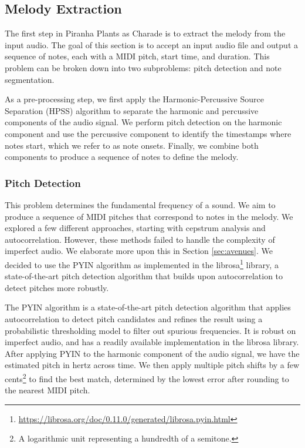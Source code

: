 \subsection{Melody Extraction}
\label{sec:melody_extraction}

The first step in Piranha Plants as Charade is to extract the melody from the input audio. The goal of this section is to accept an input audio file and output a sequence of notes, each with a MIDI pitch, start time, and duration. This problem can be broken down into two subproblems: pitch detection and note segmentation.

As a pre-processing step, we first apply the Harmonic-Percussive Source Separation (HPSS) algorithm \autocite{HPSS:2010,HPSS:2014} to separate the harmonic and percussive components of the audio signal. We perform pitch detection on the harmonic component and use the percussive component to identify the timestamps where notes start, which we refer to as note onsets. Finally, we combine both components to produce a sequence of notes to define the melody.

\subsubsection{Pitch Detection}

This problem determines the fundamental frequency of a sound. We aim to produce a sequence of MIDI pitches that correspond to notes in the melody. We explored a few different approaches, starting with cepstrum analysis and autocorrelation. However, these methods failed to handle the complexity of imperfect audio. We elaborate more upon this in Section \ref{sec:avenues}. We decided to use the PYIN algorithm \autocite{PYIN:2014} as implemented in the librosa\footnote{\url{https://librosa.org/doc/0.11.0/generated/librosa.pyin.html}} library, a state-of-the-art pitch detection algorithm that builds upon autocorrelation to detect pitches more robustly.

The PYIN algorithm is a state-of-the-art pitch detection algorithm that applies autocorrelation to detect pitch candidates and refines the result using a probabilistic thresholding model to filter out spurious frequencies. It is robust on imperfect audio, and has a readily available implementation in the librosa library. After applying PYIN to the harmonic component of the audio signal, we have the estimated pitch in hertz across time. We then apply multiple pitch shifts by a few cents\footnote{A logarithmic unit representing a hundredth of a semitone.} to find the best match, determined by the lowest error after rounding to the nearest MIDI pitch.

